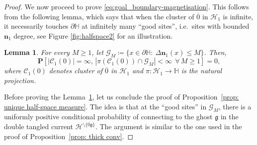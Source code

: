 \documentclass[11pt,a4paper]{article}
\newtheorem{lemma}[theorem]{Lemma}
\theoremstyle{definition}
\numberwithin{equation}{section}
\newcommand\n{\mathbf{n}}
\newcommand\fg{\mathfrak{g}}
\begin{document}
\begin{proof}
We now proceed to prove \eqref{eq:goal_boundary-magnetisation}.
This follows from the following lemma, which says that when the cluster of $\overline{0}$ in $\mathcal{H}_1$ is infinite, it necessarily touches $\partial \mathbb H$ at infinitely many ``good sites'', i.e.~sites with bounded $\n_1$ degree, see Figure \ref{fig:halfspace2} for an illustration.

\begin{lemma}\label{lem:infinite_touch-points}
For every $M\geq1$, let $\mathcal{G}_M\coloneqq \{x\in\partial \mathbb{H}:~\Delta{\n_1}(x)\leq M\}$. Then,
    \begin{equation}\label{eq:infinite_touch-points}
    \mathbf{P}
    [ |\mathcal{C}_1(0)|=\infty,\, |\pi(\mathcal{C}_1(0))\cap \mathcal{G}_M|<\infty~~ \forall\, M\geq1]=0,
    \end{equation}
where $\mathcal{C}_1(0)$ denotes cluster of $\overline 0$ in $\mathcal{H}_1$ and $\pi:\mathcal{H}_1\to \mathbb{H}$ is the natural projection.
\end{lemma}

Before proving the Lemma~\ref{lem:infinite_touch-points}, let us conclude the proof of Proposition~\ref{prop: unique half-space measure}. The idea 
is that at the ``good sites'' in $\mathcal{G}_M$, there is a uniformly positive conditional probability of connecting to the ghost $\fg$ in the double tangled current $\mathcal{H}^{\setminus \{\overline{0}\fg\}}$. The argument is similar to the one used in the proof of Proposition~\ref{prop: thick conv}. 


\end{proof}
\end{document}
